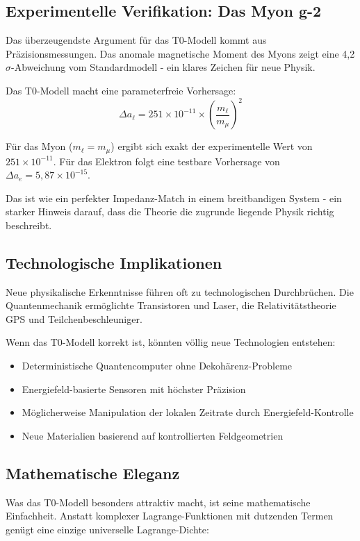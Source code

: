 \documentclass[12pt,a4paper]{article}
\begin{document}
\subsection{Experimentelle Verifikation: Das Myon g-2}

Das überzeugendste Argument für das T0-Modell kommt aus Präzisionsmessungen. Das anomale magnetische Moment des Myons zeigt eine 4,2$\sigma$-Abweichung vom Standardmodell - ein klares Zeichen für neue Physik.

Das T0-Modell macht eine parameterfreie Vorhersage:
$$\Delta a_\ell = 251 \times 10^{-11} \times \left(\frac{m_\ell}{m_\mu}\right)^2$$

Für das Myon ($m_\ell = m_\mu$) ergibt sich exakt der experimentelle Wert von $251 \times 10^{-11}$. Für das Elektron folgt eine testbare Vorhersage von $\Delta a_e = 5,87 \times 10^{-15}$.

Das ist wie ein perfekter Impedanz-Match in einem breitbandigen System - ein starker Hinweis darauf, dass die Theorie die zugrunde liegende Physik richtig beschreibt.

\subsection{Technologische Implikationen}

Neue physikalische Erkenntnisse führen oft zu technologischen Durchbrüchen. Die Quantenmechanik ermöglichte Transistoren und Laser, die Relativitätstheorie GPS und Teilchenbeschleuniger.

Wenn das T0-Modell korrekt ist, könnten völlig neue Technologien entstehen:
\begin{itemize}
	\item Deterministische Quantencomputer ohne Dekohärenz-Probleme
	\item Energiefeld-basierte Sensoren mit höchster Präzision
	\item Möglicherweise Manipulation der lokalen Zeitrate durch Energiefeld-Kontrolle
	\item Neue Materialien basierend auf kontrollierten Feldgeometrien
\end{itemize}

\subsection{Mathematische Eleganz}

Was das T0-Modell besonders attraktiv macht, ist seine mathematische Einfachheit. Anstatt komplexer Lagrange-Funktionen mit dutzenden Termen genügt eine einzige universelle Lagrange-Dichte:
\end{document}
